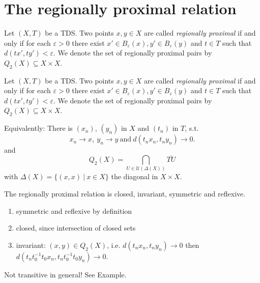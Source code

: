 \section{The regionally proximal relation}

\begin{frame}
  \begin{definition}
    \label{def:rpr}
    Let $(X, T)$ be a TDS.
    Two points $x,y \in X$ are called \emph{regionally proximal}
    if and only if for each $\varepsilon > 0$ there exist $x' \in B_\varepsilon(x), y' \in B_\varepsilon(y)$
    and $t \in T$ such that $d(tx', ty') < \varepsilon$.
    We denote the set of regionally proximal pairs by $Q_2(X) \subseteq X \times X$.
  \end{definition}

  \begin{center}
    
  \end{center}
    
\end{frame}

\begin{frame}

  \begin{definition}
    \label{def:rpr}
    Let $(X, T)$ be a TDS.
    Two points $x,y \in X$ are called \emph{regionally proximal}
    if and only if for each $\varepsilon > 0$ there exist $x' \in B_\varepsilon(x), y' \in B_\varepsilon(y)$
    and $t \in T$ such that $d(tx', ty') < \varepsilon$.
    We denote the set of regionally proximal pairs by $Q_2(X) \subseteq X \times X$.
  \end{definition}
  Equivalently: There is $(x_n)$, $(y_n)$ in $X$ and $(t_n)$ in $T$, s.t.
  \begin{equation*}
      \label{eq:rprchar}
      x_n \to x, \ y_n \to y \ \text{and} \ d(t_n x_n, t_n y_n) \to 0.
  \end{equation*} 
  and
  \begin{equation*}
    Q_2(X) = \bigcap_{U \in \mathcal{U}(\Delta(X))} \overline{TU} 
  \end{equation*}
  with $\Delta(X) = \{(x, x) \ | \ x \in X\}$ the diagonal in $X \times X$.
\end{frame}

\begin{frame}
\begin{theorem}
  The regionally proximal relation is closed, invariant, symmetric and reflexive.
\end{theorem}

\begin{enumerate}
  \item symmetric and reflexive by definition
  \item closed, since intersection of closed sets
  \item invariant: $(x, y) \in Q_2(X)$, i.e. $d(t_n x_n, t_n y_n) \to 0$ then $d(t_n t_0^{-1} t_0 x_n, t_n t_0^{-1} t_0 y_n) \to 0$.
\end{enumerate}

Not transitive in general! See Example.
\end{frame}

